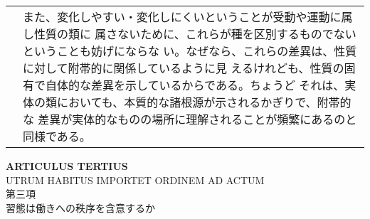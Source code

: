 \documentclass[10pt]{jsarticle} %
\begin{document}
\begin{longtable}{p{21em}p{21em}}
&

また、変化しやすい・変化しにくいということが受動や運動に属し性質の類に
属さないために、これらが種を区別するものでないということも妨げにならな
い。なぜなら、これらの差異は、性質に対して附帯的に関係しているように見
えるけれども、性質の固有で自体的な差異を示しているからである。ちょうど
それは、実体の類においても、本質的な諸根源が示されるかぎりで、附帯的な
差異が実体的なものの場所に理解されることが頻繁にあるのと同様である。

\\
\end{longtable}



\schema
{
}
{
  \schema
  {
  }
  {
  }
  \schema
  {}
  {}
  {}
}



\newpage



\begin{center}
{\Large {\bf ARTICULUS TERTIUS}}\\
{\large UTRUM HABITUS IMPORTET ORDINEM AD ACTUM}\\
{\Large 第三項\\習態は働きへの秩序を含意するか}
\end{center}
\end{document}
